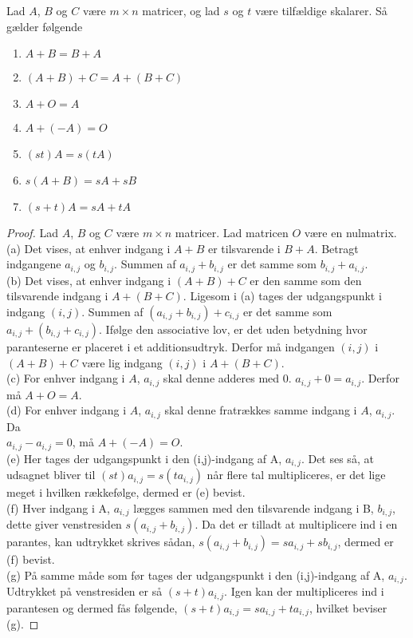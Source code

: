 \begin{stn}
Lad $A$, $B$ og $C$ være $m \times n$ matricer, og lad $s$ og $t$ være tilfældige skalarer. 
Så gælder følgende
\begin{enumerate}[label=(\alph*)]
\item $A + B = B + A$
\item $(A + B) + C = A + (B + C)$
\item $A + O = A$
\item $A + (-A) = O$
\item $(st) A = s (tA)$
\item $s(A + B) = sA + sB$
\item $(s+t)A = sA + tA$
\end{enumerate}
\label{stn_regn}
\end{stn}

\begin{proof} 
Lad $A$, $B$ og $C$ være $m \times n$ matricer. Lad matricen $O$ være en nulmatrix. \\
(a) Det vises, at enhver indgang i $A + B$ er tilsvarende i $B + A$. Betragt indgangene $a_{i,j}$ og $b_{i,j}$. Summen af $a_{i,j} + b_{i,j}$ er det samme som $b_{i,j} + a_{i,j}$. \\
(b) Det vises, at enhver indgang i $(A + B) + C$ er den samme som den tilsvarende indgang i $A + (B + C)$. Ligesom i (a) tages der udgangspunkt i indgang $(i,j)$. Summen af $(a_{i,j} + b_{i,j}) + c_{i,j}$ er det samme som $a_{i,j} + (b_{i,j} + c_{i,j})$. Ifølge den associative lov, er det uden betydning hvor paranteserne er placeret i et additionsudtryk. Derfor må indgangen $(i,j)$ i $(A + B) + C$ være lig indgang $(i,j)$ i $A + (B + C)$. \\
(c) For enhver indgang i $A$, $a_{i,j}$ skal denne adderes med $0$. $a_{i,j}+0=a_{i,j}$. Derfor må $A + O = A$. \\
(d) For enhver indgang i $A$, $a_{i,j}$ skal denne fratrækkes samme indgang i $A$, $a_{i,j}$. Da \\ $a_{i,j} - a_{i,j} = 0$, må $A + (-A) = O$. \\
(e) Her tages der udgangspunkt i den (i,j)-indgang af A, $a_{i,j}$. Det ses så, at udsagnet bliver til $(st)a_{i,j} = s(ta_{i,j})$ når flere tal multipliceres, er det lige meget i hvilken rækkefølge, dermed er (e) bevist. \\
(f) Hver indgang i A, $a_{i,j}$ lægges sammen med den tilsvarende indgang i B, $b_{i,j}$, dette giver venstresiden $s(a_{i,j}+b_{i,j})$. Da det er tilladt at multiplicere ind i en parantes, kan udtrykket skrives sådan, $s(a_{i,j}+b_{i,j})=sa_{i,j}+sb_{i,j}$, dermed er (f) bevist. \\
(g) På samme måde som før tages der udgangspunkt i den (i,j)-indgang af A, $a_{i,j}$. Udtrykket på venstresiden er så $(s+t)a_{i,j}$. Igen kan der multipliceres ind i parantesen og dermed fås følgende, $(s+t)a_{i,j}=sa_{i,j}+ta_{i,j}$, hvilket beviser (g).
\end{proof}

